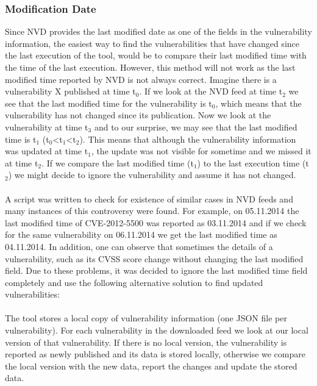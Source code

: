 \subsubsection{Modification Date}
Since NVD provides the last modified date as one of the fields in the vulnerability information, the easiest way to find the vulnerabilities that have changed since the last execution of the tool, would be to compare their last modified time with the time of the last execution. However, this method will not work as the last modified time reported by NVD is not always correct. Imagine there is a vulnerability X published at time t$_{\text{0}}$. If we look at the NVD feed at time t$_{\text{2}}$ we see that the last modified time for the vulnerability is t$_{\text{0}}$, which means that the vulnerability has not changed since its publication. Now we look at the vulnerability at time t$_{\text{3}}$ and to our surprise, we may see that the last modified time is t$_{\text{1}}$  (t$_{\text{0}}$<t$_{\text{1}}$<t$_{\text{2}}$). This means that although the vulnerability information was updated at time t$_{\text{1}}$, the update was not visible for sometime and we missed it at time t$_{\text{2}}$. If we compare the last modified time (t$_{\text{1}}$) to the last execution time (t$_{\text{2}}$) we might decide to ignore the vulnerability and assume it has not changed. 
\paragraph{}
A script was written to check for existence of similar cases in NVD feeds and many instances of this controversy were found. For example, on 05.11.2014 the last modified time of CVE-2012-5500 was reported as 03.11.2014 and if we check for the same vulnerability on 06.11.2014 we get the last modified time as 04.11.2014. In addition, one can observe that sometimes the details of a vulnerability, such as its CVSS score change without changing the last modified field. Due to these problems, it was decided to ignore the last modified time field completely and use the following alternative solution to find updated vulnerabilities:
\paragraph{}
The tool stores a local copy of vulnerability information (one JSON file per vulnerability). For each vulnerability in the downloaded feed we look at our local version of that vulnerability. If there is no local version, the vulnerability is reported as newly published and its data is stored locally, otherwise we compare the local version with the new data, report the changes and update the stored data.
